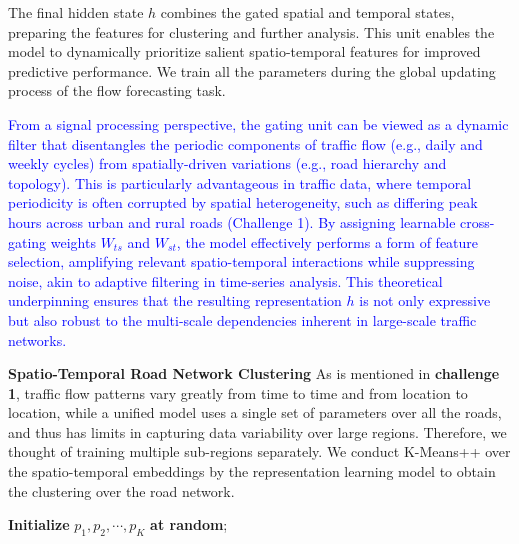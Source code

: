 \documentclass[lettersize,journal]{IEEEtran}
\begin{document}
The final hidden state $h$ combines the gated spatial and temporal states, preparing the features for clustering and further analysis. This unit enables the model to dynamically prioritize salient spatio-temporal features for improved predictive performance. We train all the parameters during the global updating process of the flow forecasting task.

\textcolor{blue}{From a signal processing perspective, the gating unit can be viewed as a dynamic filter that disentangles the periodic components of traffic flow (e.g., daily and weekly cycles) from spatially-driven variations (e.g., road hierarchy and topology). This is particularly advantageous in traffic data, where temporal periodicity is often corrupted by spatial heterogeneity, such as differing peak hours across urban and rural roads (Challenge 1). By assigning learnable cross-gating weights \(W_{ts}\) and \(W_{st}\), the model effectively performs a form of feature selection, amplifying relevant spatio-temporal interactions while suppressing noise, akin to adaptive filtering in time-series analysis. This theoretical underpinning ensures that the resulting representation \(h\) is not only expressive but also robust to the multi-scale dependencies inherent in large-scale traffic networks.}

\textbf{Spatio-Temporal Road Network Clustering}
As is mentioned in \textbf{challenge 1}, traffic flow patterns vary greatly from time to time and from location to location, while a unified model uses a single set of parameters over all the roads, and thus has limits in capturing data variability over large regions. Therefore, we thought of training multiple sub-regions separately. We conduct K-Means++ over the spatio-temporal embeddings by the representation learning model to obtain the clustering over the road network.

\begin{algorithm}[htbp]
    \textbf{Initialize} $p_1, p_2, \cdots, p_K $ \textbf{at random};\;
    \caption{\textcolor{blue}{Spatio-Temporal Representation Clustering}} 
    \label{algo:representation_learning} 
\end{algorithm}
\end{document}

